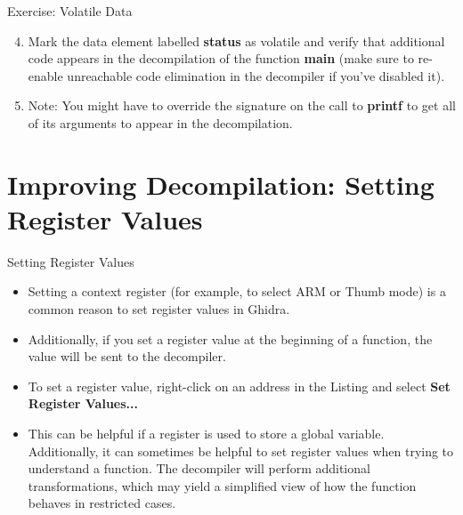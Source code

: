 \documentclass{beamer}
\begin{document}
\begin{frame}
\begin{block}{Exercise: Volatile Data}
\begin{enumerate}
\setcounter{enumi}{3}
\item Mark the data element labelled \textbf{status} as volatile and verify that additional code appears in the decompilation 
of the function \textbf{main} (make sure to re-enable unreachable code elimination in the decompiler if you've disabled it). 
\item Note: You might have to override the signature on the call to \textbf{printf} to get all of its arguments to appear in the decompilation.
\end{enumerate}
\end{block}
\end{frame}

\section{Improving Decompilation: Setting Register Values}

\begin{frame}
\begin{block}{Setting Register Values}
\begin{itemize}
\item Setting a context register (for example, to select ARM or Thumb mode) is a common reason to set register values in Ghidra.
\item Additionally, if you set a register value at the beginning of a function, the value will be sent to the decompiler.
\item To set a register value, right-click on an address in the Listing and select \textbf{Set Register Values...}
\item This can be helpful if a register is used to store a global variable.  Additionally, it can sometimes be helpful to set register values when trying to 
understand a function.  The decompiler will perform additional transformations, which may yield a simplified view of how the function behaves in restricted cases.
\end{itemize}
\end{block}
\end{frame}
\end{document}
